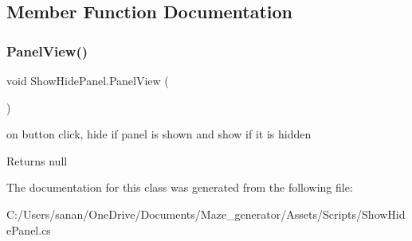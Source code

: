 \subsection{Member Function Documentation}
\mbox{\label{class_show_hide_panel_a3a78bdebb7227fbabdef8064e70aa276}} 
\subsubsection{\texorpdfstring{PanelView()}{PanelView()}}
{\footnotesize\ttfamily void Show\+Hide\+Panel.\+Panel\+View (\begin{DoxyParamCaption}{ }\end{DoxyParamCaption})}



on button click, hide if panel is shown and show if it is hidden 

\begin{DoxyReturn}{Returns}
null 
\end{DoxyReturn}


The documentation for this class was generated from the following file\+:\begin{DoxyCompactItemize}
\item 
C\+:/\+Users/sanan/\+One\+Drive/\+Documents/\+Maze\+\_\+generator/\+Assets/\+Scripts/Show\+Hide\+Panel.\+cs\end{DoxyCompactItemize}
